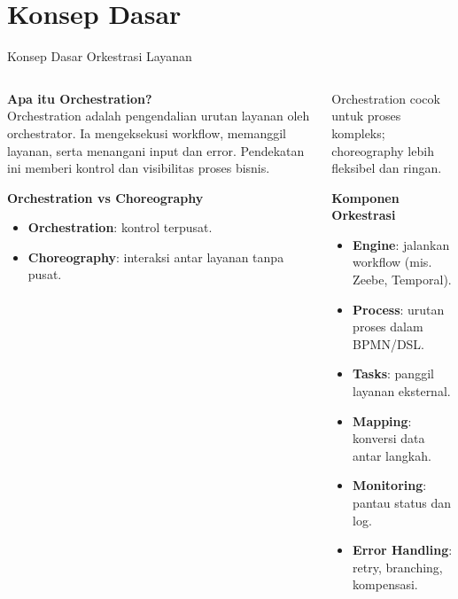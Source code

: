 \documentclass[aspectratio=169, table]{beamer}
\begin{document}
\section{Konsep Dasar}

\begin{frame}[fragile]{Konsep Dasar Orkestrasi Layanan}
	\vspace{20pt}
	\begin{columns}[T]
		\begin{column}{0.45\textwidth}
			\textbf{Apa itu Orchestration?} \\
			Orchestration adalah pengendalian urutan layanan oleh orchestrator. Ia mengeksekusi workflow, memanggil layanan, serta menangani input dan error. Pendekatan ini memberi kontrol dan visibilitas proses bisnis.
			
			\vspace{6pt}
			\textbf{Orchestration vs Choreography}
			\begin{itemize}
				\item \textbf{Orchestration}: kontrol terpusat.
				\item \textbf{Choreography}: interaksi antar layanan tanpa pusat.
			\end{itemize}
			
		\end{column}
		
		\begin{column}{0.55\textwidth}
			Orchestration cocok untuk proses kompleks; choreography lebih fleksibel dan ringan.
			
			\textbf{Komponen Orkestrasi}
			\begin{itemize}
				\item \textbf{Engine}: jalankan workflow (mis. Zeebe, Temporal).
				\item \textbf{Process}: urutan proses dalam BPMN/DSL.
				\item \textbf{Tasks}: panggil layanan eksternal.
				\item \textbf{Mapping}: konversi data antar langkah.
				\item \textbf{Monitoring}: pantau status dan log.
				\item \textbf{Error Handling}: retry, branching, kompensasi.
			\end{itemize}
		\end{column}
	\end{columns}
\end{frame}
\end{document}
